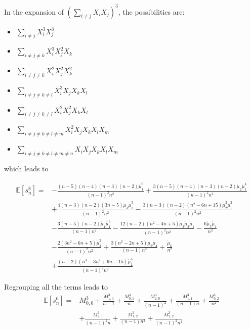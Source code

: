 \documentclass{imsart}
\numberwithin{equation}{section}
\theoremstyle{plain}
\theoremstyle{remark}
\begin{document}
In the expansion of $(\sum_{i \neq j} X_i X_j)^3$, the possibilities are:
\begin{itemize}
\item $\sum_{i \neq j} X_i^3 X_j^3$
\item $\sum_{i \neq j \neq k} X_i^3 X_j^2 X_k$
\item $\sum_{i \neq j \neq k} X_i^2 X_j^2 X_k^2$
\item $\sum_{i \neq j \neq k \neq l} X_i^3 X_j X_k X_l$
\item $\sum_{i \neq j \neq k \neq l} X_i^2 X_j^2 X_k X_l$
\item $\sum_{i \neq j \neq k \neq l \neq m} X_i^2 X_j X_k X_l X_m$
\item $\sum_{i \neq j \neq k \neq l \neq m \neq n} X_i X_j X_k X_l X_m$
\end{itemize}

which leads to 
\begin{footnotesize}
\begin{align} 
\mathbb{E}[ s_n^8 ] =   &  -\frac{(n-5) (n-4) (n-3) (n-2) \acute{\mu }_1^6}{(n-1)^2 n^2} 
+\frac{3 (n-5) (n-4) (n-3) (n-2) \acute{\mu }_2 \acute{\mu }_1^4}{(n-1)^2 n^2} \nonumber \\ &
+\frac{4 (n-3) (n-2) (3 n-5) \acute{\mu }_3 \acute{\mu }_1^3}{(n-1)^2 n^2}
-\frac{3 (n-3) (n-2) \left(n^2-6 n+15\right) \acute{\mu }_2^2 \acute{\mu }_1^2}{(n-1)^2 n^2} \nonumber \\ &
-\frac{3 (n-5) (n-2) \acute{\mu }_4 \acute{\mu }_1^2}{(n-1) n^2} 
-\frac{12 (n-2) \left(n^2-4 n+5\right) \acute{\mu }_2 \acute{\mu }_3 \acute{\mu }_1}{(n-1)^2 n^2}
-\frac{6 \acute{\mu }_5 \acute{\mu }_1}{n^2} \nonumber \\ &
-\frac{2 \left(3 n^2-6 n+5\right) \acute{\mu }_3^2}{(n-1)^2 n^2} 
+\frac{3 \left(n^2-2 n+5\right) \acute{\mu }_2 \acute{\mu }_4}{(n-1) n^2}  
+\frac{\acute{\mu }_6}{n^2} \nonumber \\ &
+\frac{(n-2) \left(n^3-3 n^2+9 n-15\right) \acute{\mu }_2^3}{(n-1)^2 n^2} 
\end{align} 
\end{footnotesize}


Regrouping all the terms leads to
\begin{align} 
\mathbb{E}[ s_n^6 ] =   & M^3_{0,0} +\frac{M^3_{1,0}}{n-1} + \frac{M^3_{0,1}}{n} + \frac{M^3_{2,0}}{(n-1)^2} + \frac{M^3_{1,1}}{(n-1) n} + \frac{M^3_{0,2}}{n^2} \nonumber \\ &
 + \frac{M^3_{2,1}} {(n-1)^2 n}  +  \frac{M^3_{1,2}} {(n-1) n^2}  +  \frac{M^3_{2,2}} {(n-1)^2 n^2}   
\end{align}
\end{document}
